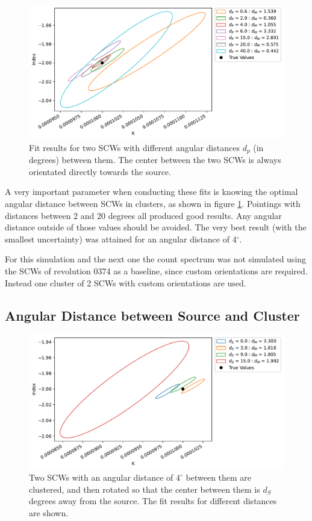 \documentclass{report}
\begin{document}
\begin{figure}[h]
  \centering
  \includegraphics[width=\textwidth]{Images/Pure_Simulation/combined_plot_pointing_distances.pdf}
  \caption{Fit results for two SCWs with different angular distances $d_p$ (in degrees) between them. The center between the two SCWs is always orientated directly towards the source.}
  \label{fig pointing distances}
\end{figure}

A very important parameter when conducting these fits is knowing the optimal angular distance between SCWs in clusters, as shown in figure \ref{fig pointing distances}. Pointings with distances between 2 and 20 degrees all produced good results. Any angular distance outside of those values should be avoided. The very best result (with the smallest uncertainty) was attained for an angular distance of 4$^\circ$.

For this simulation and the next one the count spectrum was not simulated using the SCWs of revolution 0374 as a baseline, since custom orientations are required. Instead one cluster of 2 SCWs with custom orientations are used.


\subsection{Angular Distance between Source and Cluster}

\begin{figure}[h]
  \centering
  \includegraphics[width=\textwidth]{Images/Pure_Simulation/combined_plot_source_distances.pdf}
  \caption{Two SCWs with an angular distance of $4^\circ$ between them are clustered, and then rotated so that the center between them is $d_S$ degrees away from the source. The fit results for different distances are shown.}
  \label{fig source distance}
\end{figure}
\end{document}
